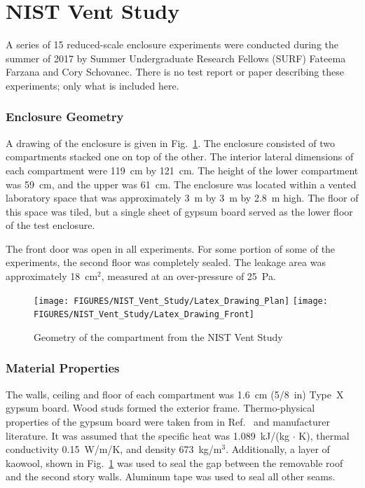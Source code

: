 \section{NIST Vent Study}
\label{NIST_Vent_Description}

A series of 15 reduced-scale enclosure experiments were conducted during the summer of 2017 by Summer Undergraduate Research Fellows (SURF) Fateema Farzana and Cory Schovanec. There is no test report or paper describing these experiments; only what is included here.

\subsubsection{Enclosure Geometry}
\label{Enclosure_Geometry}

A drawing of the enclosure is given in Fig.~\ref{NIST_Vent_Study_Drawing}. The enclosure consisted of two compartments stacked one on top of the other. The interior lateral dimensions of each compartment were 119~cm by 121~cm. The height of the lower compartment was 59~cm, and the upper was 61~cm. The enclosure was located within a vented laboratory space that was approximately 3~m by 3~m by 2.8~m high. The floor of this space was tiled, but a single sheet of gypsum board served as the lower floor of the test enclosure.

The front door was open in all experiments. For some portion of some of the experiments, the second floor was completely sealed. The leakage area was approximately 18~cm$^2$, measured at an over-pressure of 25~Pa.

\begin{figure}[p]
\texttt{[image: FIGURES/NIST\_Vent\_Study/Latex\_Drawing\_Plan]}
\texttt{[image: FIGURES/NIST\_Vent\_Study/Latex\_Drawing\_Front]}
\caption[Geometry of the compartment from the NIST Vent Study]{Geometry of the compartment from the NIST Vent Study}
\label{NIST_Vent_Study_Drawing}
\end{figure}

\subsubsection{Material Properties}

The walls, ceiling and floor of each compartment was 1.6~cm (5/8~in) Type~X gypsum board. Wood studs formed the exterior frame. Thermo-physical properties of the gypsum board were taken from in Ref.~\cite{Manzello:SiF08} and manufacturer literature. It was assumed that the specific heat was 1.089~kJ/(kg $\cdot$ K), thermal conductivity 0.15~W/m/K, and density 673~kg/m$^3$.  Additionally, a  layer of kaowool, shown in Fig.~\ref{NIST_Vent_Study_Drawing} was used to seal the gap between the removable roof and the second story walls. Aluminum tape was used to seal all other seams.

